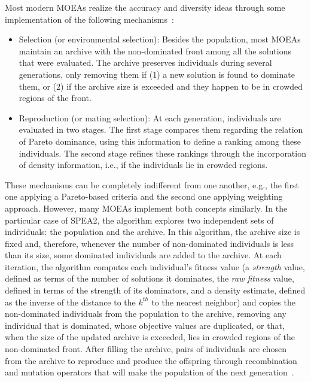 	Most modern \acp{MOEA} realize the accuracy and diversity ideas through some implementation of the following mechanisms~\cite{Zitzler2001SPEA2}:	
	\begin{itemize}
		\item Selection (or environmental selection): Besides the population, most \acp{MOEA} maintain an archive with the non-dominated front among all the solutions that were evaluated. The archive preserves individuals during several generations, only removing them if (1) a new solution is found to dominate them, or (2) if the archive size is exceeded and they happen to be in crowded regions of the front.
		
		\item Reproduction (or mating selection): At each generation, individuals are evaluated in two stages. The first stage compares them regarding the relation of Pareto dominance, using this information to define a ranking among these individuals. The second stage refines these rankings through the incorporation of density information, i.e., if the individuals lie in crowded regions.
	\end{itemize}
	
	These mechanisms can be completely indifferent from one another, e.g., the first one applying a Pareto-based criteria and the second one applying weighting approach. However, many \acp{MOEA} implement both concepts similarly. In the particular case of \ac{SPEA2}, the algorithm explores two independent sets of individuals: the population and the archive. In this algorithm, the archive size is fixed and, therefore, whenever the number of non-dominated individuals is less than its size, some dominated individuals are added to the archive. At each iteration, the algorithm computes each individual's fitness value (a \textit{strength} value, defined as terms of the number of solutions it dominates, the \textit{raw fitness} value, defined in terms of the strength of its dominators, and a density estimate, defined as the inverse of the distance to the $k^{th}$ to the nearest neighbor) and copies the non-dominated individuals from the population to the archive, removing any individual that is dominated, whose objective values are duplicated, or that, when the size of the updated archive is exceeded, lies in crowded regions of the non-dominated front. After filling the archive, pairs of individuals are chosen from the archive to reproduce and produce the offspring through recombination and mutation operators that will make the population of the next generation~\cite{Zitzler2001SPEA2}.
	
